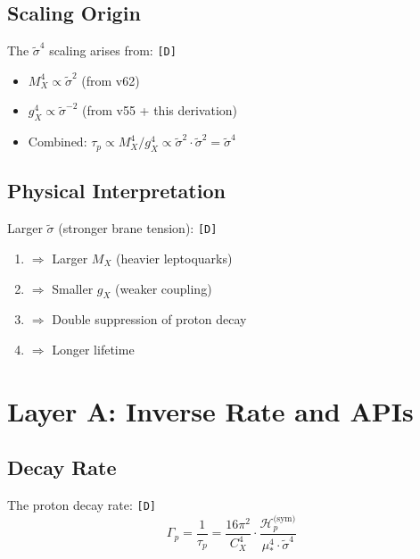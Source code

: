 \documentclass[11pt,a4paper]{article}
\newcommand{\tagD}{\textcolor{green!50!black}{\texttt{[D]}}}
\theoremstyle{definition}
\begin{document}
\subsection{Scaling Origin}
\label{subsec:scaling-origin}

The $\tilde{\sigma}^4$ scaling arises from: \tagD{}
\begin{itemize}
  \item $M_X^4 \propto \tilde{\sigma}^2$ (from v62)
  \item $g_X^4 \propto \tilde{\sigma}^{-2}$ (from v55 + this derivation)
  \item Combined: $\tau_p \propto M_X^4/g_X^4 \propto \tilde{\sigma}^2 \cdot \tilde{\sigma}^2 = \tilde{\sigma}^4$
\end{itemize}

\subsection{Physical Interpretation}
\label{subsec:physical-interp}

Larger $\tilde{\sigma}$ (stronger brane tension): \tagD{}
\begin{enumerate}
  \item $\Rightarrow$ Larger $M_X$ (heavier leptoquarks)
  \item $\Rightarrow$ Smaller $g_X$ (weaker coupling)
  \item $\Rightarrow$ Double suppression of proton decay
  \item $\Rightarrow$ Longer lifetime
\end{enumerate}

\section{Layer A: Inverse Rate and APIs}
\label{sec:inverse-rate}

\subsection{Decay Rate}
\label{subsec:decay-rate}

The proton decay rate: \tagD{}
\begin{equation}
\label{eq:decay-rate-final}
\Gamma_p = \frac{1}{\tau_p} = \frac{16\pi^2}{C_X^4} \cdot \frac{\mathcal{H}_p^{\text{(sym)}}}{\mu_*^4 \cdot \tilde{\sigma}^4}
\end{equation}
\end{document}
